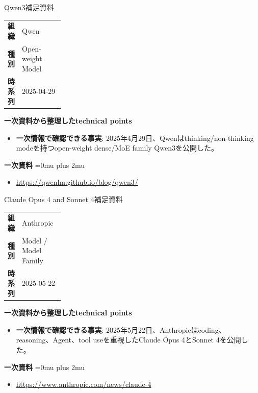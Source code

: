 \begin{technicalnote}{Qwen3}{補足資料}
\begingroup
\begin{tabularx}{\linewidth}{@{}>{\bfseries}p{0.22\linewidth}X@{}}
組織 & Qwen \\
種別 & Open-weight Model \\
時系列 & 2025-04-29 \\
\end{tabularx}
\smallskip
\begin{minipage}{\linewidth}
{\bfseries 一次資料から整理したtechnical points}
\begin{itemize}[leftmargin=1.5em,itemsep=0.35em]
\item \textbf{一次情報で確認できる事実}: 2025年4月29日、Qwenはthinking/non-thinking modeを持つopen-weight dense/MoE family Qwen3を公開した。
\end{itemize}
\begin{samepage}
{\bfseries 一次資料}
\begingroup\sloppy
\Urlmuskip=0mu plus 2mu\relax
\begin{itemize}[leftmargin=1.5em,itemsep=0.25em]
\item {\scriptsize\url{https://qwenlm.github.io/blog/qwen3/}}
\end{itemize}
\endgroup
\end{samepage}
\end{minipage}
\endgroup
\end{technicalnote}
\medskip

\begin{technicalnote}{Claude Opus 4 and Sonnet 4}{補足資料}
\begingroup
\begin{tabularx}{\linewidth}{@{}>{\bfseries}p{0.22\linewidth}X@{}}
組織 & Anthropic \\
種別 & Model / Model Family \\
時系列 & 2025-05-22 \\
\end{tabularx}
\smallskip
\begin{minipage}{\linewidth}
{\bfseries 一次資料から整理したtechnical points}
\begin{itemize}[leftmargin=1.5em,itemsep=0.35em]
\item \textbf{一次情報で確認できる事実}: 2025年5月22日、Anthropicはcoding、reasoning、Agent、tool useを重視したClaude Opus 4とSonnet 4を公開した。
\end{itemize}
\begin{samepage}
{\bfseries 一次資料}
\begingroup\sloppy
\Urlmuskip=0mu plus 2mu\relax
\begin{itemize}[leftmargin=1.5em,itemsep=0.25em]
\item {\scriptsize\url{https://www.anthropic.com/news/claude-4}}
\end{itemize}
\endgroup
\end{samepage}
\end{minipage}
\endgroup
\end{technicalnote}
\medskip

